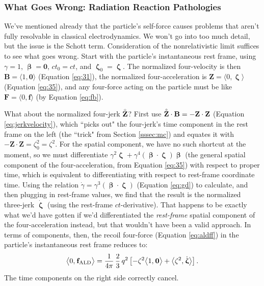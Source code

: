 \documentclass[12pt]{article}
\renewcommand{\mathring}[1]{\accentset{\circ}{#1}}
\renewcommand{\vv}[1]{\mathbf{#1}}
\newcommand{\vvbeta}{\bm{\upbeta}}
\newcommand{\vvzeta}{\bm{\upzeta}}
\begin{document}
\subsubsection{What Goes Wrong: Radiation Reaction Pathologies}\label{sssec:pathologies}

We've mentioned already that the particle's self-force causes problems that aren't fully resolvable in classical electrodynamics. We won't go into too much detail, but the issue is the Schott term. Consideration of the nonrelativistic limit suffices to see what goes wrong. Start with the particle's instantaneous rest frame, using $\gamma = 1$, $\vvbeta = \vv 0$, $ct_0 = ct$, and $\vvzeta_0 = \vvzeta$. The normalized four-velocity is then $\vv B = \langle 1, \vv 0 \rangle$ (Equation \ref{eq:31}), the normalized four-acceleration is $\vv Z = \langle 0, \vvzeta \rangle$ (Equation \ref{eq:35}), and any four-force acting on the particle must be like ${\vv F = \langle 0, \vv f \rangle}$ (by Equation \ref{eq:fb}).

What about the normalized four-jerk $\mathring{\vv Z}$? First use $\mathring{\vv Z} \cdot \vv B = - \vv Z \cdot \vv Z$ (Equation \ref{eq:jerkvelocity}), which ``picks out" the four-jerk's time component in the rest frame on the left (the ``trick" from Section \ref{sssec:mc}) and equates it with $- \vv Z \cdot \vv Z = \zeta_0^2 = \zeta^2$. For the spatial component, we have no such shortcut at the moment, so we must differentiate $\gamma^2 \vvzeta + \gamma^4 (\vvbeta \cdot \vvzeta) \vvbeta$ (the general spatial component of the four-acceleration, from Equation \ref{eq:35}) with respect to proper time, which is equivalent to differentiating with respect to rest-frame coordinate time. Using the relation $\dot{\gamma} = \gamma^3 (\vvbeta \cdot \vvzeta)$ (Equation \ref{eq:gd}) to calculate, and then plugging in rest-frame values, we find that the result is the normalized three-jerk $\dot{\vvzeta}$ (using the rest-frame $ct$-derivative). That happens to be exactly what we'd have gotten if we'd differentiated the \emph{rest-frame} spatial component of the four-acceleration instead, but that wouldn't have been a valid approach. In terms of components, then, the recoil four-force (Equation \ref{eq:aldff}) in the particle's instantaneous rest frame reduces to:
\begin{equation*}
\big \langle 0, \mkern1mu \vv f_{\textrm{ALD}} \big \rangle = \dfrac{1}{4 \pi} \, \dfrac{2}{3} \, q^2  \left[ - \zeta^2 \big \langle 1, \mkern1mu \vv 0 \big \rangle + \big \langle \zeta^2, \mkern1mu \dot{\vvzeta}  \big \rangle \right] .
\end{equation*}
The time components on the right side correctly cancel.
\end{document}
